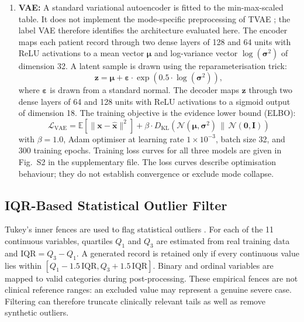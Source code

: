 \documentclass[journal]{IEEEtran}
\begin{document}
\begin{enumerate}
\item {\textbf {VAE:}} A standard variational autoencoder is fitted to the min-max-scaled table. It does not implement the mode-specific preprocessing of TVAE \cite{xu2019}; the label VAE therefore identifies the architecture evaluated here. The encoder maps each patient record through two dense layers of 128 and 64 units with ReLU activations to a mean vector $\boldsymbol{\mu}$ and log-variance vector $\log(\boldsymbol{\sigma}^2)$ of dimension 32. A latent sample is drawn using the reparameterisation trick:
\begin{equation}
\mathbf{z} = \boldsymbol{\mu} + \boldsymbol{\varepsilon} \cdot \exp(0.5 \cdot \log(\boldsymbol{\sigma}^2)),
\end{equation}
where $\boldsymbol{\varepsilon}$ is drawn from a standard normal. The decoder maps $\mathbf{z}$ through two dense layers of 64 and 128 units with ReLU activations to a sigmoid output of dimension 18. The training objective is the evidence lower bound (ELBO):
\begin{equation}
\mathcal{L}_{\text{VAE}} = \mathbb{E}\!\left[\|\mathbf{x} - \hat{\mathbf{x}}\|^2\right] + \beta \cdot D_{\text{KL}}\!\left(\mathcal{N}(\boldsymbol{\mu}, \boldsymbol{\sigma}^2) \,\|\, \mathcal{N}(\mathbf{0}, \mathbf{I})\right)
\end{equation}
with $\beta = 1.0$, Adam optimiser at learning rate $1 \times 10^{-3}$, batch size 32, and 300 training epochs. Training loss curves for all three models are given in Fig.~S2 in the supplementary file. The loss curves describe optimisation behaviour; they do not establish convergence or exclude mode collapse.
\end{enumerate}

\subsection{IQR-Based Statistical Outlier Filter}

Tukey's inner fences are used to flag statistical outliers \cite{nistfences}. For each of the 11 continuous variables, quartiles $Q_1$ and $Q_3$ are estimated from real training data and $\mathrm{IQR}=Q_3-Q_1$. A generated record is retained only if every continuous value lies within $[Q_1-1.5\,\mathrm{IQR},Q_3+1.5\,\mathrm{IQR}]$. Binary and ordinal variables are mapped to valid categories during post-processing. These empirical fences are not clinical reference ranges: an excluded value may represent a genuine severe case. Filtering can therefore truncate clinically relevant tails as well as remove synthetic outliers.
\end{document}
